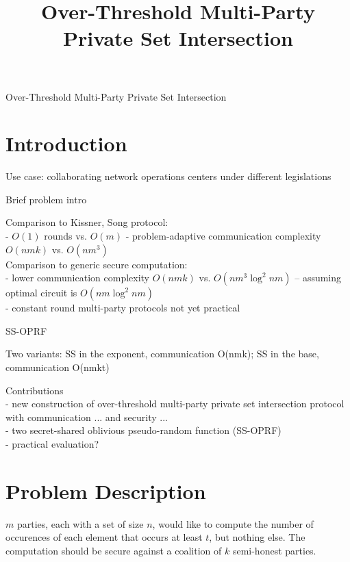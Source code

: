 \documentclass[10pt, sigconf]{acmart}
\title{Over-Threshold Multi-Party Private Set Intersection}
\date{}
\begin{document}
\pagestyle{plain} %
\onecolumn
\begingroup
\centering
{\Huge Over-Threshold Multi-Party Private Set Intersection}\\[3em]
\endgroup

\section{Introduction}

Use case: collaborating network operations centers under different legislations

Brief problem intro

Comparison to Kissner, Song protocol: \\
- $O(1)$ rounds vs. $O(m)$
- problem-adaptive communication complexity $O(nmk)$ vs. $O(nm^3)$ \\

Comparison to generic secure computation: \\
- lower communication complexity $O(nmk)$ vs. $O(nm^3 \log^2 nm)$ -- assuming optimal circuit is $O(nm \log^2 nm)$ \\
- constant round multi-party protocols not yet practical

SS-OPRF

Two variants: SS in the exponent, communication O(nmk); SS in the base, communication O(nmkt)

Contributions \\
- new construction of over-threshold multi-party private set intersection protocol with communication ... and security ... \\
- two secret-shared oblivious pseudo-random function (SS-OPRF) \\
- practical evaluation?

\section{Problem Description}

$m$ parties, each with a set of size $n$, would like to compute the number of occurences of each element that occurs at least $t$, but nothing else.
The computation should be secure against a coalition of $k$ semi-honest parties.
\end{document}
